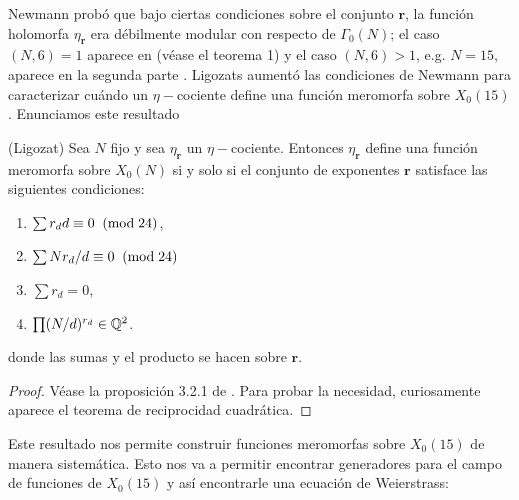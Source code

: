 \documentclass[../../tesis_maestria]{subfiles}
\begin{document}
Newmann probó que bajo ciertas condiciones sobre el conjunto $\mathbf{r}$, la función holomorfa $\eta_\mathbf{r}$ era débilmente modular con respecto de $\Gamma_0(N)$; el caso $(N,6)=1$ aparece en \cite{NewmanCAAOACOMFI} (véase el teorema 1) y el caso $(N,6)>1$, e.g. $N=15$, aparece en la segunda parte \cite{NewmanCAAOACOMFII}. Ligozats aumentó las condiciones de Newmann para caracterizar cuándo un $\eta-$cociente define una función meromorfa sobre $X_0(15)$. Enunciamos este resultado

\begin{thm}\label{thm:ligozats}
	(Ligozat) Sea $N$ fijo y sea $\eta_\mathbf{r}$ un $\eta-$cociente. Entonces $\eta_\mathbf{r}$ define una función meromorfa sobre $X_0(N)$ si y solo si el conjunto de exponentes $\mathbf{r}$ satisface las siguientes condiciones:
	\begin{enumerate}[label=(\roman*)]
		\item $\sum r_d d \equiv 0 \;\;(\mathrm{mod}\; 24)$,
		\item $\sum N r_d/d\equiv0\;\;(\mathrm{mod}\; 24)$
		\item $\sum r_d=0$,
		\item $\prod (N/d)^{r_d}\in\mathbb{Q}^2$.
	\end{enumerate}
	donde las sumas y el producto se hacen sobre $\mathbf{r}$.
\end{thm}
\begin{proof}
	Véase la proposición 3.2.1 de \cite{LigozatCMDG1}. Para probar la necesidad, curiosamente aparece el teorema de reciprocidad cuadrática.
\end{proof}

Este resultado nos permite construir funciones meromorfas sobre $X_0(15)$ de manera sistemática. Esto nos va a permitir encontrar generadores para el campo de funciones de $X_0(15)$ y así encontrarle una ecuación de Weierstrass:
\end{document}
